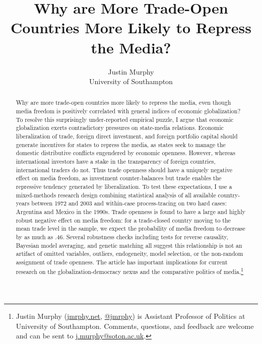 \documentclass[12pt,a4paper]{article}\usepackage[]{graphicx}\usepackage[]{color}
\begin{document}
\title{Why are More Trade-Open Countries More Likely to Repress the Media?}

\author{Justin Murphy\\
University of Southampton}

\maketitle

\begin{singlespace}
\begin{abstract}
Why are more trade-open countries more likely to repress the media, even though media freedom is positively correlated with general indices of economic globalization? To resolve this surprisingly under-reported empirical puzzle, I argue that economic globalization exerts contradictory pressures on state-media relations. Economic liberalization of trade, foreign direct investment, and foreign portfolio capital should generate incentives for states to repress the media, as states seek to manage the domestic distributive conflicts engendered by economic openness. However, whereas international investors have a stake in the transparency of foreign countries, international traders do not. Thus trade openness should have a uniquely negative effect on media freedom, as investment counter-balances but trade enables the repressive tendency generated by liberalization. To test these expectations, I use a mixed-methods research design combining statistical analysis of all available country-years between 1972 and 2003 and within-case process-tracing on two hard cases: Argentina and Mexico in the 1990s. Trade openness is found to have a large and highly robust negative effect on media freedom: for a trade-closed country moving to the mean trade level in the sample, we expect the probability of media freedom to decrease by as much as .46. Several robustness checks including tests for reverse causality, Bayesian model averaging, and genetic matching all suggest this relationship is not an artifact of omitted variables, outliers, endogeneity, model selection, or the non-random assignment of trade openness. The article has important implications for current research on the globalization-democracy nexus and the comparative politics of media.\footnote{Justin Murphy (\href{http://jmrphy.net}{jmrphy.net}, \href{http://twitter.com/jmrphy}{@jmrphy}) is Assistant Professor of Politics at University of Southampton. Comments, questions, and feedback are welcome and can be sent to \href{mailto:j.murphy@soton.ac.uk}{j.murphy@soton.ac.uk}.}

\end{abstract}
\end{singlespace}
\end{document}
